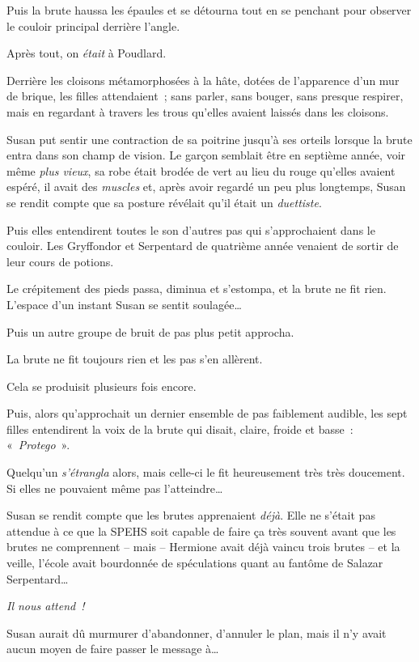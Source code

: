 Puis la brute haussa les épaules et se détourna tout en se penchant pour observer le couloir principal derrière l'angle.

Après tout, on \emph{était} à Poudlard.

Derrière les cloisons métamorphosées à la hâte, dotées de l'apparence d'un mur de brique, les filles attendaient~; sans parler, sans bouger, sans presque respirer, mais en regardant à travers les trous qu'elles avaient laissés dans les cloisons.

Susan put sentir une contraction de sa poitrine jusqu'à ses orteils lorsque la brute entra dans son champ de vision.
Le garçon semblait être en septième année, voir même \emph{plus vieux}, sa robe était brodée de vert au lieu du rouge qu'elles avaient espéré, il avait des \emph{muscles} et, après avoir regardé un peu plus longtemps, Susan se rendit compte que sa posture révélait qu'il était un \emph{duettiste}.

Puis elles entendirent toutes le son d'autres pas qui s'approchaient dans le couloir.
Les Gryffondor et Serpentard de quatrième année venaient de sortir de leur cours de potions.

Le crépitement des pieds passa, diminua et s'estompa, et la brute ne fit rien.
L'espace d'un instant Susan se sentit soulagée…

Puis un autre groupe de bruit de pas plus petit approcha.

La brute ne fit toujours rien et les pas s'en allèrent.

Cela se produisit plusieurs fois encore.

Puis, alors qu'approchait un dernier ensemble de pas faiblement audible, les sept filles entendirent la voix de la brute qui disait, claire, froide et basse~: «~\emph{Protego}~».

Quelqu'un \emph{s'étrangla} alors, mais celle-ci le fit heureusement très très doucement.
Si elles ne pouvaient même pas l'atteindre…

Susan se rendit compte que les brutes apprenaient \emph{déjà}.
Elle ne s'était pas attendue à ce que la SPEHS soit capable de faire ça très souvent avant que les brutes ne comprennent -- mais -- Hermione avait déjà vaincu trois brutes -- et la veille, l'école avait bourdonnée de spéculations quant au fantôme de Salazar Serpentard…

\emph{Il nous attend~!}

Susan aurait dû murmurer d'abandonner, d'annuler le plan, mais il n'y avait aucun moyen de faire passer le message à…

